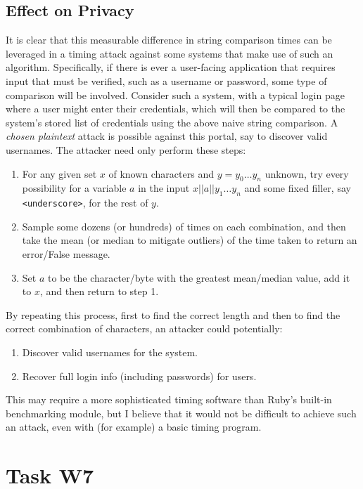 \documentclass{article}
\providecommand{\task}[1]{\section*{Task #1}}
\providecommand{\tightlist}{
    \setlength{\itemsep}{0pt}\setlength{\parskip}{0pt}
}
\providecommand{\inlinecode}{\texttt}
\begin{document}
\subsection*{Effect on Privacy}
It is clear that this measurable difference in string comparison times can be leveraged in a timing attack against some systems that make use of such an algorithm. Specifically, if there is ever a user-facing application that requires input that must be verified, such as a username or password, some type of comparison will be involved. Consider such a system, with a typical login page where a user might enter their credentials, which will then be compared to the system's stored list of credentials using the above naive string comparison. A \textit{chosen plaintext} attack is possible against this portal, say to discover valid usernames. The attacker need only perform these steps:
\begin{enumerate}\tightlist
  \item For any given set $x$ of known characters and $y = {y_0 \dots y_n}$ unknown, try every possibility for a variable $a$ in the input $x || a || y_1 \dots y_n$ and some fixed filler, say \inlinecode{<underscore>}, for the rest of $y$.
  \item Sample some dozens (or hundreds) of times on each combination, and then take the mean (or median to mitigate outliers) of the time taken to return an error/False message.
  \item Set $a$ to be the character/byte with the greatest mean/median value, add it to $x$, and then return to step 1.
\end{enumerate}
By repeating this process, first to find the correct length and then to find the correct combination of characters, an attacker could potentially:
\begin{enumerate}\tightlist
  \item Discover valid usernames for the system.
  \item Recover full login info (including passwords) for users.
\end{enumerate}

This may require a more sophisticated timing software than Ruby's built-in benchmarking module, but I believe that it would not be difficult to achieve such an attack, even with (for example) a basic timing program.

\task{W7}
\end{document}
